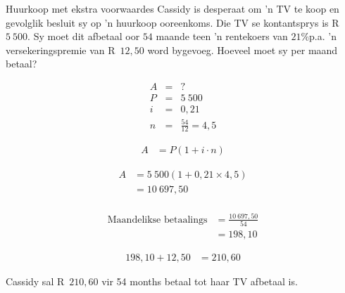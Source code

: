 \begin{wex}{Huurkoop met ekstra voorwaardes}{
    Cassidy is desperaat om 'n TV te koop en gevolglik besluit sy op 'n huurkoop ooreenkoms. Die TV se kontantsprys is R~$5~500$. Sy moet dit afbetaal oor $54$ maande teen 'n rentekoers van $21\%$p.a. 'n versekeringspremie van R~$12,50$ word bygevoeg. Hoeveel moet sy per maand betaal?}{

    \begin{eqnarray*}
	A &=& ?\\
	P &=& 5~500\\
	i &=& 0,21\\
	n &=& \frac{54}{12} = 4,5
    \end{eqnarray*}

    \begin{align*}
	    A &= P(1 + i \cdot n)
    \end{align*}

    \begin{align*}
	A &= 5~500(1 + 0,21 \times 4,5)\\
	  &= 10~697,50\\
    \end{align*}

    \begin{align*}
	\text{Maandelikse betaalings} &= \frac{10~697,50}{54}\\
			&= 198,10
    \end{align*}

    \begin{align*}
	198,10 + 12,50 &= 210,60
    \end{align*}

    Cassidy sal R~$210,60$ vir 54 months betaal tot haar TV afbetaal is.
}
\end{wex}




